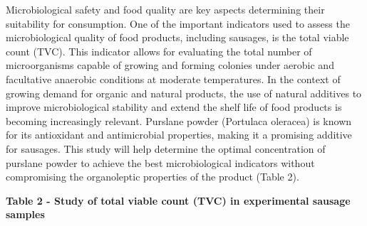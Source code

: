 Microbiological safety and food quality are key aspects determining
their suitability for consumption. One of the important indicators used
to assess the microbiological quality of food products, including
sausages, is the total viable count (TVC). This indicator allows for
evaluating the total number of microorganisms capable of growing and
forming colonies under aerobic and facultative anaerobic conditions at
moderate temperatures. In the context of growing demand for organic and
natural products, the use of natural additives to improve
microbiological stability and extend the shelf life of food products is
becoming increasingly relevant. Purslane powder (Portulaca oleracea) is
known for its antioxidant and antimicrobial properties, making it a
promising additive for sausages. This study will help determine the
optimal concentration of purslane powder to achieve the best
microbiological indicators without compromising the organoleptic
properties of the product (Table 2).

{\bfseries Table 2 - Study of total viable count (TVC) in experimental
sausage samples}

